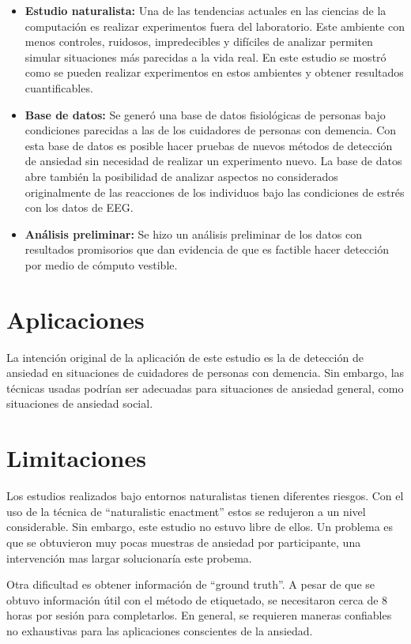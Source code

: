 	\begin{itemize}
		\item \textbf{Estudio naturalista:} Una de las tendencias actuales en las ciencias de la computaci\'on es realizar experimentos fuera del laboratorio. Este ambiente con menos controles, ruidosos, impredecibles y dif\'iciles de analizar permiten simular situaciones m\'as parecidas a la vida real. En este estudio se mostr\'o como se pueden realizar experimentos en estos ambientes y obtener resultados cuantificables.

	\item \textbf{Base de datos:} Se gener\'o una base de datos fisiol\'ogicas de personas bajo condiciones parecidas a las de los cuidadores de personas con demencia. Con esta base de datos es posible hacer pruebas de nuevos m\'etodos de detecci\'on de ansiedad sin necesidad de realizar un experimento nuevo. La base de datos abre tambi\'en la posibilidad de analizar aspectos no considerados originalmente de las reacciones de los individuos bajo las condiciones de estr\'es con los datos de EEG.

		\item \textbf{An\'alisis preliminar:} Se hizo un an\'alisis preliminar de los datos con resultados promisorios que dan evidencia de que es factible hacer detecci\'on por medio de c\'omputo vestible.
	\end{itemize}
\section{Aplicaciones}
	La intenci\'on original de la aplicaci\'on de este estudio es la de detecci\'on de ansiedad en situaciones de cuidadores de personas con demencia. Sin embargo, las t\'ecnicas usadas podr\'ian ser adecuadas para situaciones de ansiedad general, como situaciones de ansiedad social.
\section{Limitaciones}
        Los estudios realizados bajo entornos naturalistas tienen diferentes riesgos. Con el uso de la t\'ecnica de ``naturalistic enactment'' estos se redujeron a un nivel considerable. Sin embargo, este estudio no estuvo libre de ellos. Un problema es que se obtuvieron muy pocas muestras de ansiedad por participante, una intervenci\'on mas largar solucionar\'ia este probema.

	Otra dificultad es obtener informaci\'on de ``ground truth''. A pesar de que se obtuvo informaci\'on \'util con el m\'etodo de etiquetado, se necesitaron cerca de 8 horas por sesi\'on para completarlos. En general, se requieren maneras confiables no exhaustivas para las aplicaciones conscientes de la ansiedad.

